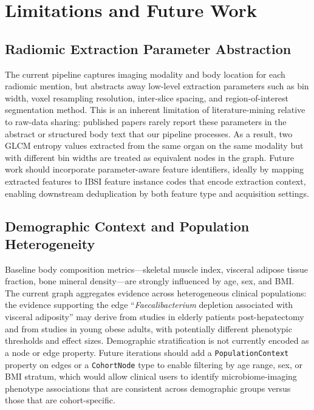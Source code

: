 \documentclass[12pt, letterpaper]{article}
\begin{document}
\section{Limitations and Future Work}

\subsection{Radiomic Extraction Parameter Abstraction}

The current pipeline captures imaging modality and body location for each radiomic mention, but abstracts away low-level extraction parameters such as bin width, voxel resampling resolution, inter-slice spacing, and region-of-interest segmentation method. This is an inherent limitation of literature-mining relative to raw-data sharing: published papers rarely report these parameters in the abstract or structured body text that our pipeline processes. As a result, two GLCM entropy values extracted from the same organ on the same modality but with different bin widths are treated as equivalent nodes in the graph. Future work should incorporate parameter-aware feature identifiers, ideally by mapping extracted features to IBSI feature instance codes that encode extraction context, enabling downstream deduplication by both feature type and acquisition settings.

\subsection{Demographic Context and Population Heterogeneity}

Baseline body composition metrics—skeletal muscle index, visceral adipose tissue fraction, bone mineral density—are strongly influenced by age, sex, and BMI. The current graph aggregates evidence across heterogeneous clinical populations: the evidence supporting the edge ``\textit{Faecalibacterium} depletion associated with visceral adiposity'' may derive from studies in elderly patients post-hepatectomy and from studies in young obese adults, with potentially different phenotypic thresholds and effect sizes. Demographic stratification is not currently encoded as a node or edge property. Future iterations should add a \texttt{PopulationContext} property on edges or a \texttt{CohortNode} type to enable filtering by age range, sex, or BMI stratum, which would allow clinical users to identify microbiome-imaging phenotype associations that are consistent across demographic groups versus those that are cohort-specific.
\end{document}
